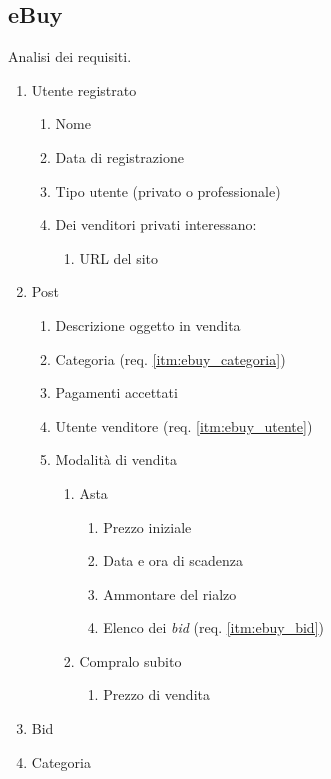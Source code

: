 \subsection{eBuy}

Analisi dei requisiti.

\begin{enumerate}
    \item \label{itm:ebuy_utente} Utente registrato
    \begin{enumerate}
        \item Nome
        \item Data di registrazione
        \item Tipo utente (privato o professionale)
        \item Dei venditori privati interessano:
        \begin{enumerate}
            \item URL del sito
        \end{enumerate}
    \end{enumerate}
    \item Post
    \begin{enumerate}
        \item Descrizione oggetto in vendita
        \item Categoria (req. \ref{itm:ebuy_categoria})
        \item Pagamenti accettati
        \item Utente venditore (req. \ref{itm:ebuy_utente})
        \item Modalit\`a di vendita
        \begin{enumerate}
            \item Asta
            \begin{enumerate}
                \item Prezzo iniziale
                \item Data e ora di scadenza
                \item Ammontare del rialzo
                \item Elenco dei \emph{bid} (req. \ref{itm:ebuy_bid})
            \end{enumerate}
            \item Compralo subito
            \begin{enumerate}
                \item Prezzo di vendita
            \end{enumerate}
        \end{enumerate}
    \end{enumerate}
    \item \label{itm:ebuy_bid} Bid
    \item \label{itm:ebuy_categoria} Categoria
\end{enumerate}

